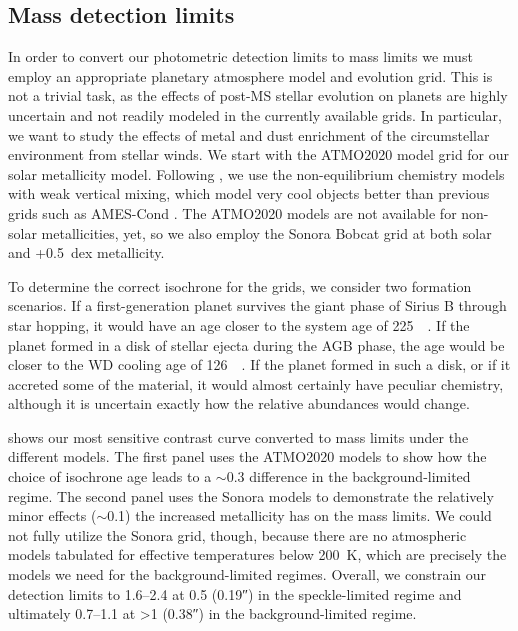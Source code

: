 \documentclass[twocolumn]{aastex631}
\begin{document}
\subsection{Mass detection limits}

In order to convert our photometric detection limits to mass limits we must employ an appropriate planetary atmosphere model and evolution grid. This is not a trivial task, as the effects of post-MS stellar evolution on planets are highly uncertain and not readily modeled in the currently available grids. In particular, we want to study the effects of metal and dust enrichment of the circumstellar environment from stellar winds. We start with the ATMO2020 model grid \citep{phillipsNewSetAtmosphere2020a} for our solar metallicity model. Following \citet{pathakHighContrastImaging2021}, we use the non-equilibrium chemistry models with weak vertical mixing, which model very cool objects better than previous grids such as AMES-Cond \citep{allardModelsVerylowmassStars2012}. The ATMO2020 models are not available for non-solar metallicities, yet, so we also employ the Sonora Bobcat grid \citep{marleySonoraBobcatCloudfree2021,marleySonoraBrownDwarf2021} at both solar and +\qty{0.5}{dex} metallicity.

To determine the correct isochrone for the grids, we consider two formation scenarios. If a first-generation planet survives the giant phase of Sirius B through star hopping, it would have an age closer to the system age of \qty{225}{\mega\year}. If the planet formed in a disk of stellar ejecta during the AGB phase, the age would be closer to the WD cooling age of \qty{126}{\mega\year}. If the planet formed in such a disk, or if it accreted some of the material, it would almost certainly have peculiar chemistry, although it is uncertain exactly how the relative abundances would change.

 shows our most sensitive contrast curve converted to mass limits under the different models. The first panel uses the ATMO2020 models to show how the choice of isochrone age leads to a $\sim$\qty{0.3}{\jupitermass} difference in the background-limited regime. The second panel uses the Sonora models to demonstrate the relatively minor effects ($\sim$\qty{0.1}{\jupitermass}) the increased metallicity has on the mass limits. We could not fully utilize the Sonora grid, though, because there are no atmospheric models tabulated for effective temperatures below \qty{200}{\kelvin}, which are precisely the models we need for the background-limited regimes. Overall, we constrain our detection limits to \qtyrange{1.6}{2.4}{\jupitermass} at \qty{0.5}{\au} (\ang{;;0.19}) in the speckle-limited regime and ultimately \qtyrange{0.7}{1.1}{\jupitermass} at \textgreater\qty{1}{\au} (\ang{;;0.38}) in the background-limited regime.
\end{document}
